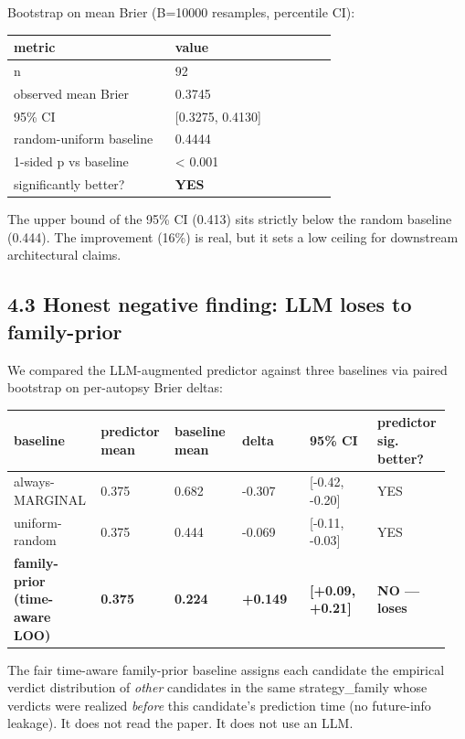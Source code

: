 \documentclass[11pt,a4paper]{article}
\begin{document}
Bootstrap on mean Brier (B=10000 resamples, percentile CI):

\begin{center}
\small
\begin{tabular}{p{0.475\linewidth}p{0.475\linewidth}}
\toprule
\textbf{metric} & \textbf{value} \\
\midrule
n & 92 \\
observed mean Brier & 0.3745 \\
95\% CI & [0.3275, 0.4130] \\
random-uniform baseline & 0.4444 \\
1-sided p vs baseline & < 0.001 \\
significantly better? & \textbf{YES} \\
\bottomrule
\end{tabular}
\end{center}

The upper bound of the 95\% CI (0.413) sits strictly below the random baseline (0.444). The improvement (16\%) is real, but it sets a low ceiling for downstream architectural claims.

\subsection{4.3 Honest negative finding: LLM loses to family-prior}

We compared the LLM-augmented predictor against three baselines via paired bootstrap on per-autopsy Brier deltas:

\begin{center}
\small
\begin{tabular}{p{0.158\linewidth}p{0.158\linewidth}p{0.158\linewidth}p{0.158\linewidth}p{0.158\linewidth}p{0.158\linewidth}}
\toprule
\textbf{baseline} & \textbf{predictor mean} & \textbf{baseline mean} & \textbf{delta} & \textbf{95\% CI} & \textbf{predictor sig. better?} \\
\midrule
always-MARGINAL & 0.375 & 0.682 & -0.307 & [-0.42, -0.20] & YES \\
uniform-random & 0.375 & 0.444 & -0.069 & [-0.11, -0.03] & YES \\
\textbf{family-prior (time-aware LOO)} & \textbf{0.375} & \textbf{0.224} & \textbf{+0.149} & \textbf{[+0.09, +0.21]} & \textbf{NO — loses} \\
\bottomrule
\end{tabular}
\end{center}

The fair time-aware family-prior baseline assigns each candidate the empirical verdict distribution of \textit{other} candidates in the same strategy\_family whose verdicts were realized \textit{before} this candidate's prediction time (no future-info leakage). It does not read the paper. It does not use an LLM.
\end{document}
